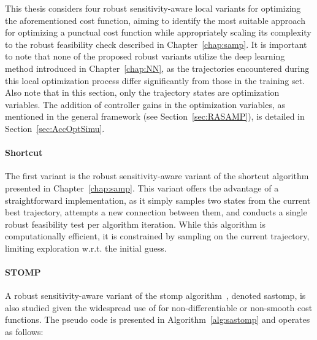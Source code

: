 This thesis considers four robust sensitivity-aware local variants for optimizing the aforementioned cost function, aiming to identify the most suitable approach for optimizing a punctual cost function while appropriately scaling its complexity to the robust feasibility check described in Chapter~\ref{chap:samp}. 
It is important to note that none of the proposed robust variants utilize the deep learning method introduced in Chapter~\ref{chap:NN}, as the trajectories encountered during this local optimization process differ significantly from those in the training set.
Also note that in this section, only the trajectory states are optimization variables. 
The addition of controller gains in the optimization variables, as mentioned in the general framework (see Section~\ref{sec:RASAMP}), is detailed in Section~\ref{sec:AccOptSimu}.

\paragraph{Shortcut}

The first variant is the robust sensitivity-aware variant of the shortcut algorithm~\cite{cShortcut} presented in Chapter~\ref{chap:samp}.
This variant offers the advantage of a straightforward implementation, as it simply samples two states from the current best trajectory, attempts a new connection between them, and conducts a single robust feasibility test per algorithm iteration.
While this algorithm is computationally efficient, it is constrained by sampling on the current trajectory, limiting exploration w.r.t. the initial guess.

\paragraph{STOMP}

A robust sensitivity-aware variant of the \gls{stomp} algorithm~\cite{cSTOMP}, denoted \gls{sastomp}, is also studied given the widespread use of  for non-differentiable or non-smooth cost functions.
The pseudo code is presented in Algorithm~\ref{alg:sastomp} and operates as follows:

